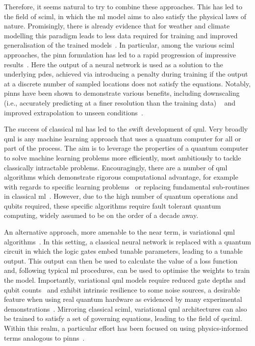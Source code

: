 \documentclass[aps,pra,a4paper,twocolumn,longbibliography,groupedaddress]{revtex4-2}
\begin{document}
Therefore, it seems natural to try to combine these approaches. This has led to the field of \gls{sciml}, in which the \gls{ml} model aims to also satisfy the physical laws of nature. Promisingly, there is already evidence that for weather and climate modelling this paradigm leads to less data required for training and improved generalisation of the trained models~\cite{kashinath2021physics}. 
%
In particular, among the various \gls{sciml} approaches, the \gls{pinn} formulation has led to a rapid progression of impressive results~\cite{wu2020enforcing, manepalli2019emulating, beucler2019achieving, bihlo2022physics}. 
Here the output of a neural network is used as a solution to the underlying \glspl{pde}, achieved via introducing a penalty during training if the output at a discrete number of sampled locations does not satisfy the equations. Notably,
\glspl{pinn} have been shown to demonstrate various benefits, including downscaling (i.e., accurately predicting at a finer resolution than the training data) ~\cite{stengel2020adversarial} and improved extrapolation to unseen conditions~\cite{esmaeilzadeh2020meshfreeflownet}.

The success of classical \gls{ml} has led to the swift development of \gls{qml}. Very broadly \gls{qml} is any machine learning approach that uses a quantum computer for all or part of the process. The aim is to leverage the properties of a quantum computer to solve machine learning problems more efficiently, most ambitiously to tackle classically intractable problems.
Encouragingly, there are a number of \gls{qml} algorithms which demonstrate rigorous computational advantage, for example  with regards to specific learning problems~\cite{liu2021rigorous, lloyd2016quantum, huang2022quantum} or replacing fundamental sub-routines in classical \gls{ml}~\cite{harrow2009quantum, liu2024towards}.  However, due to the high number of quantum operations and qubits required, these specific algorithms require fault tolerant quantum computing, widely assumed to be on the order of a decade away.


An alternative approach, more amenable to the near term, is variational \gls{qml} algorithms~\cite{havlivcek2019supervised, schuld2019quantum, cerezo2021variational}. In this setting, a classical neural network is replaced with a quantum circuit in which the logic gates embed tunable parameters, leading to a tunable output. This output can then be used to calculate the value of a loss function and, following typical \gls{ml} procedures, can be used to optimise the weights to train the model. Importantly, variational \gls{qml} models require reduced gate depths and qubit counts~\cite{perdomo-ortiz2018} and exhibit intrinsic resilience to some noise sources, a desirable feature when using real quantum hardware as evidenced by many experimental demonstrations~\cite{hubregtsen2022training, abbas2021power, jaderberg2022quantum}.
Mirroring classical \gls{sciml}, variational \gls{qml} architectures can also be trained to satisfy a set of governing equations, leading to the field of \gls{qsciml}. Within this realm, a particular effort has been focused on using physics-informed terms analogous to \glspl{pinn}~\cite{kyriienko2021solving, paine2023physics, heim2021quantum}. 
\end{document}
